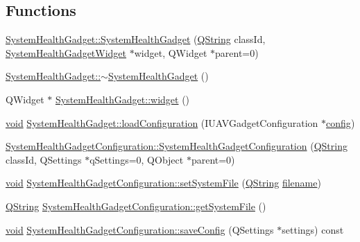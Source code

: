 \subsection*{Functions}
\begin{DoxyCompactItemize}
\item 
\hyperlink{group___system_health_plugin_ga87aa19680bf60a11eb4bd50c7df04992}{System\-Health\-Gadget\-::\-System\-Health\-Gadget} (\hyperlink{group___u_a_v_objects_plugin_gab9d252f49c333c94a72f97ce3105a32d}{Q\-String} class\-Id, \hyperlink{class_system_health_gadget_widget}{System\-Health\-Gadget\-Widget} $\ast$widget, Q\-Widget $\ast$parent=0)
\item 
\hyperlink{group___system_health_plugin_ga2212c1f05f7363aaf794f85bb9e7823c}{System\-Health\-Gadget\-::$\sim$\-System\-Health\-Gadget} ()
\item 
Q\-Widget $\ast$ \hyperlink{group___system_health_plugin_ga3732714b9995ed833047882c7e723dc0}{System\-Health\-Gadget\-::widget} ()
\item 
\hyperlink{group___u_a_v_objects_plugin_ga444cf2ff3f0ecbe028adce838d373f5c}{void} \hyperlink{group___system_health_plugin_gab876671a49f1abc2e7b8edbec5c0eaa1}{System\-Health\-Gadget\-::load\-Configuration} (I\-U\-A\-V\-Gadget\-Configuration $\ast$\hyperlink{deflate_8c_a4473b5227787415097004fd39f55185e}{config})
\item 
\hyperlink{group___system_health_plugin_gae6898d57714b4d34fc5ddc5e47e3af2e}{System\-Health\-Gadget\-Configuration\-::\-System\-Health\-Gadget\-Configuration} (\hyperlink{group___u_a_v_objects_plugin_gab9d252f49c333c94a72f97ce3105a32d}{Q\-String} class\-Id, Q\-Settings $\ast$q\-Settings=0, Q\-Object $\ast$parent=0)
\item 
\hyperlink{group___u_a_v_objects_plugin_ga444cf2ff3f0ecbe028adce838d373f5c}{void} \hyperlink{group___system_health_plugin_gae877ad975152eb4b4df1076138610d0e}{System\-Health\-Gadget\-Configuration\-::set\-System\-File} (\hyperlink{group___u_a_v_objects_plugin_gab9d252f49c333c94a72f97ce3105a32d}{Q\-String} \hyperlink{ioapi_8h_a7a03a664b090ce5c848ecb31cb4a2fa8}{filename})
\item 
\hyperlink{group___u_a_v_objects_plugin_gab9d252f49c333c94a72f97ce3105a32d}{Q\-String} \hyperlink{group___system_health_plugin_ga4807e799ef6d19b807497d0c74295b32}{System\-Health\-Gadget\-Configuration\-::get\-System\-File} ()
\item 
\hyperlink{group___u_a_v_objects_plugin_ga444cf2ff3f0ecbe028adce838d373f5c}{void} \hyperlink{group___system_health_plugin_gabbb3ed58da74764c327a4933fbc81a53}{System\-Health\-Gadget\-Configuration\-::save\-Config} (Q\-Settings $\ast$settings) const 

\end{DoxyCompactItemize}
